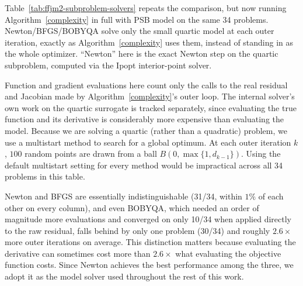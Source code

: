 \documentclass[11pt]{article}
\begin{document}
Table~\ref{tab:ffjm2-subproblem-solvers} repeats the comparison, but now
running Algorithm~\ref{complexity} in full with PSB model on the same 34
problems. Newton/BFGS/BOBYQA solve
only the small quartic model at each outer iteration, exactly as Algorithm~\ref{complexity}
uses them, instead of standing in as the whole optimizer. ``Newton''
here is the exact Newton step on the
quartic subproblem, computed via the Ipopt interior-point solver.



Function and gradient evaluations here count only the calls to the real
residual and Jacobian made by Algorithm~\ref{complexity}'s outer loop. The
internal solver's own work on the quartic surrogate is tracked
separately, since evaluating the true function and its derivative is
considerably more expensive than evaluating the model. Because we are
solving a quartic (rather than a quadratic) problem, we use a multistart
method to search for a global optimum. At each outer iteration $k$, $100$
random points are drawn from a ball $B(0, \max\{1, d_{k-1}\})$. Using the
default multistart setting for every method would be impractical across
all 34 problems in this table.

\begin{table}[htbp]
	\centering
	\caption{Algorithm~\ref{complexity} (PSB), varying only \texttt{model\_solver}, on the 34 MGH problems.}
	\label{tab:ffjm2-subproblem-solvers}
\end{table}
\FloatBarrier

\noindent
Newton and BFGS are essentially indistinguishable
(31/34, within $1\%$ of each other on every column), and even BOBYQA, which needed an order of magnitude more evaluations and converged on only
10/34 when applied directly to the raw residual, falls behind by only
one problem (30/34) and roughly $2.6\times$ more outer iterations on
average. This distinction matters because evaluating the derivative can
sometimes cost more than $2.6\times$ what evaluating the objective
function costs. Since Newton achieves the best
performance among the three, we adopt it as the model solver
used throughout the rest of this work.
\end{document}
